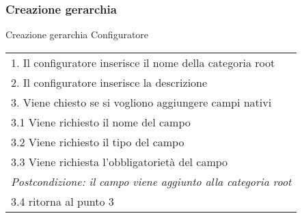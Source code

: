 \begin{minipage}{\textwidth}
    \subsubsection{Creazione gerarchia}
    \usecase
        {Creazione gerarchia}
        {Configuratore}
        {
            \begin{tabular}{l}
                1.  Il configuratore inserisce il nome della categoria root\\
                2.  Il configuratore inserisce la descrizione \\
                3.  Viene chiesto se si vogliono aggiungere campi nativi\\
                3.1 Viene richiesto il nome del campo\\
                3.2 Viene richiesto il tipo del campo\\
                3.3 Viene richiesta l'obbligatorietà del campo\\
                     \textit{Postcondizione: il campo viene aggiunto alla categoria root}\\
                3.4 ritorna al punto 3
            \end{tabular}\\
        }
        \vspace{0.5cm}
\end{minipage}